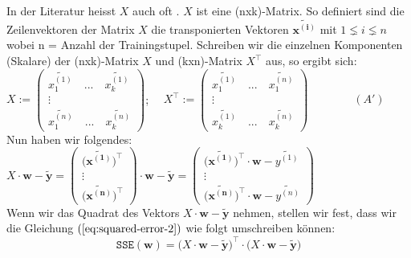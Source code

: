 \documentclass[12pt]{article}
\begin{document}
In der Literatur heisst $X$ auch oft {\color{blue}{Feature Matrix}}. $X$ ist eine (nxk)-Matrix. So definiert sind die Zeilenvektoren der Matrix $X$ die transponierten Vektoren $ \mathbf{\widetilde{x^{(i)}}} $ mit $ 1 \lneq i \lneq n $  wobei n = Anzahl der Trainingstupel. Schreiben wir die einzelnen Komponenten (Skalare) der (nxk)-Matrix $X$ und (kxn)-Matrix  $X^\top$ aus, so ergibt sich: 
\\[0.3cm]
\hspace*{2.0cm}
$ X := \left(
  \begin{array}{c}
    \widetilde{x_1^{(1)}} \quad ... \quad  \widetilde{x_k^{(1)}}\\
    \vdots \\
    \widetilde{x_1^{(n)}} \quad ... \quad  \widetilde{x_k^{(n)}}
  \end{array}
  \right) 
$;       
$ \quad X^\top := \left(
  \begin{array}{c}
    \widetilde{x_1^{(1)}} \quad ... \quad  \widetilde{x_1^{(n)}}\\
    \vdots \\
    \widetilde{x_k^{(1)}} \quad ... \quad  \widetilde{x_k^{(n)}}
  \end{array}
  \right) \qquad \qquad (A') $
\\[0.2cm]
Nun haben wir folgendes:
\\[0.4
cm]
\hspace*{1.3cm}
$X \cdot \mathbf{w} - \mathbf{\widetilde{y} }= \left(
  \begin{array}{c}
    \bigl(\mathbf{\widetilde{x^{(1)}}}\bigr)^\top \\
    \vdots \\
    \bigl(\mathbf{\widetilde{x^{(n)}}}\bigr)^\top
  \end{array}
  \right) \cdot \mathbf{w} - \mathbf{\widetilde{y}} = \left(
  \begin{array}{c}
    \bigl(\mathbf{\widetilde{x^{(1)}}}\bigr)^\top \cdot \mathbf{w} - \widetilde{y^{(1)}} \\
    \vdots \\
    \bigl(\mathbf{\widetilde{x^{(n)}}}\bigr)^\top \cdot \mathbf{w} - \widetilde{y^{(n)}}
  \end{array}
  \right)
$
\\[0.2cm]
Wenn wir das Quadrat des Vektors $X \cdot \mathbf{w} - \mathbf{\widetilde{y}}$ nehmen, stellen wir fest, dass wir die Gleichung $\left(\ref{eq:squared-error-2} \right)$ wie folgt umschreiben können:\\[0.3cm]
\begin{equation}
  \label{eq:squared-error-5}
  \mathtt{SSE}(\mathbf{w}) = \bigl( X \cdot \mathbf{w} - 
  \mathbf{\widetilde{y}} \bigr)^\top \cdot \bigl( X \cdot 
  \mathbf{w} - \mathbf{\widetilde{y}}\bigr)
\end{equation}
%
\end{document}
